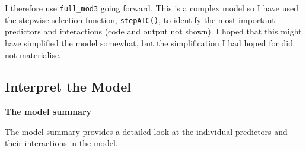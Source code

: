 \documentclass[
  letterpaper,
]{book}
\begin{document}
I therefore use \texttt{full\_mod3} going forward. This is a complex
model so I have used the stepwise selection function,
\texttt{stepAIC()}, to identify the most important predictors and
interactions (code and output not shown). I hoped that this might have
simplified the model somewhat, but the simplification I had hoped for
did not materialise.

\subsection{Interpret the Model}\label{interpret-the-model}

\textbf{The model summary}

The model summary provides a detailed look at the individual predictors
and their interactions in the model.
\end{document}
